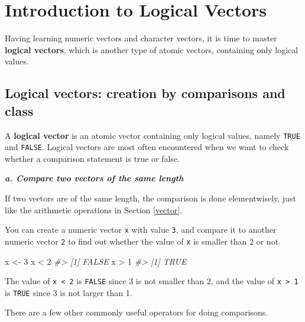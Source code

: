 \documentclass[
]{book}
\newenvironment{Shaded}{\begin{snugshade}}{\end{snugshade}}
\newcommand{\CommentTok}[1]{\textcolor[rgb]{0.56,0.35,0.01}{\textit{#1}}}
\newcommand{\DecValTok}[1]{\textcolor[rgb]{0.00,0.00,0.81}{#1}}
\newcommand{\NormalTok}[1]{#1}
\newcommand{\OtherTok}[1]{\textcolor[rgb]{0.56,0.35,0.01}{#1}}
\newcommand{\SpecialCharTok}[1]{\textcolor[rgb]{0.00,0.00,0.00}{#1}}
\begin{document}
\hypertarget{intro-logi-vector}{%
\section{Introduction to Logical Vectors}\label{intro-logi-vector}}

Having learning numeric vectors and character vectors, it is time to master \textbf{logical vectors}, which is another type of atomic vectors, containing only logical values.

\hypertarget{create-logical-vector}{%
\subsection{Logical vectors: creation by comparisons and class}\label{create-logical-vector}}

A \textbf{logical vector} is an atomic vector containing only logical values, namely \texttt{TRUE} and \texttt{FALSE}. Logical vectors are most often encountered when we want to check whether a comparison statement is true or false.

\textbf{\emph{a. Compare two vectors of the same length}}

If two vectors are of the same length, the comparison is done elementwisely, just like the arithmetic operations in Section \ref{vector}.

You can create a numeric vector \texttt{x} with value \texttt{3}, and compare it to another numeric vector \texttt{2} to find out whether the value of \texttt{x} is smaller than 2 or not.

\begin{Shaded}
\begin{Highlighting}[]
\NormalTok{x }\OtherTok{\textless{}{-}} \DecValTok{3}
\NormalTok{x }\SpecialCharTok{\textless{}} \DecValTok{2}
\CommentTok{\#\textgreater{} [1] FALSE}
\NormalTok{x }\SpecialCharTok{\textgreater{}} \DecValTok{1}
\CommentTok{\#\textgreater{} [1] TRUE}
\end{Highlighting}
\end{Shaded}

The value of \texttt{x\ \textless{}\ 2} is \texttt{FALSE} since 3 is not smaller than 2, and the value of \texttt{x\ \textgreater{}\ 1} is \texttt{TRUE} since 3 is not larger than 1.

There are a few other commonly useful operators for doing comparisons.
\end{document}
